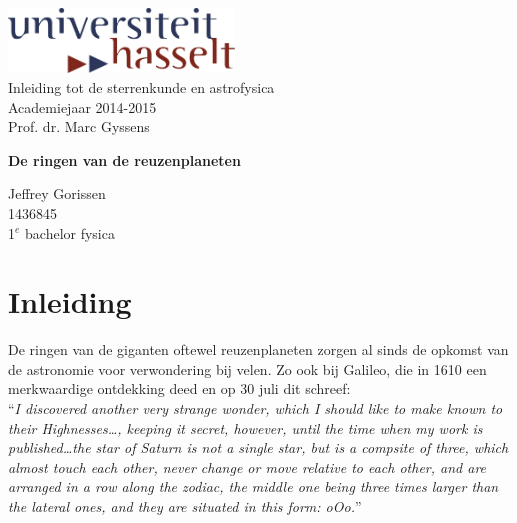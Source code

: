 \documentclass[a4paper]{article}
\begin{document}
\begin{titlepage}
  
  \begin{flushright}
	  \includegraphics[width=6cm]{img/UHasseltorigineel.jpg}\\ 
    \Large 	Inleiding tot de sterrenkunde en astrofysica \\
    				Academiejaar 2014-2015\\
    				Prof. dr. Marc Gyssens
  \end{flushright}
    \vspace*{\fill}
    		\begin{center}
      		\Huge \bf De ringen van de reuzenplaneten\\[3cm]
    		\end{center}
    \vspace*{\fill}
  \begin{flushright}
    \Large
		Jeffrey Gorissen\\
		1436845\\
		1$^e$  bachelor fysica\\
		
  \end{flushright}
  
\end{titlepage}

\tableofcontents
\newpage

\section{Inleiding}
	De ringen van de giganten oftewel reuzenplaneten zorgen al sinds de opkomst van de astronomie 
    voor verwondering bij velen. Zo ook bij Galileo, die in 1610 een merkwaardige ontdekking deed en op 30 juli dit schreef:\\
    
\noindent
	``\textit{I discovered another very strange wonder, which I should like to make known to their Highnesses\ldots, 
		keeping it secret, however, until the time when my work is published\ldots the star of Saturn is not a single star, 
		but is a compsite of three, which almost touch each other, never change or move relative to each other, 
		and are arranged in a row along the zodiac, the middle one being three times larger than the lateral ones, 
		and they are situated in this form: oOo.}'' \\
		
\end{document}
